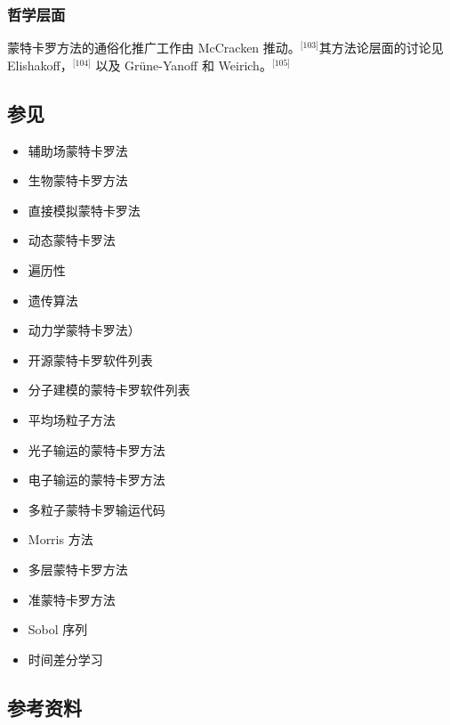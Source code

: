 \subsubsection{哲学层面}
蒙特卡罗方法的通俗化推广工作由 McCracken 推动。\(^\text{[103]}\)其方法论层面的讨论见 Elishakoff，\(^\text{[104]}\) 以及 Grüne-Yanoff 和 Weirich。\(^\text{[105]}\)
\subsection{参见}
\begin{itemize}
\item 辅助场蒙特卡罗法
\item 生物蒙特卡罗方法
\item 直接模拟蒙特卡罗法
\item 动态蒙特卡罗法
\item 遍历性
\item 遗传算法
\item 动力学蒙特卡罗法）
\item 开源蒙特卡罗软件列表
\item 分子建模的蒙特卡罗软件列表
\item 平均场粒子方法
\item 光子输运的蒙特卡罗方法
\item 电子输运的蒙特卡罗方法
\item 多粒子蒙特卡罗输运代码
\item Morris 方法
\item 多层蒙特卡罗方法
\item 准蒙特卡罗方法
\item Sobol 序列
\item 时间差分学习
\end{itemize}
\subsection{参考资料}
